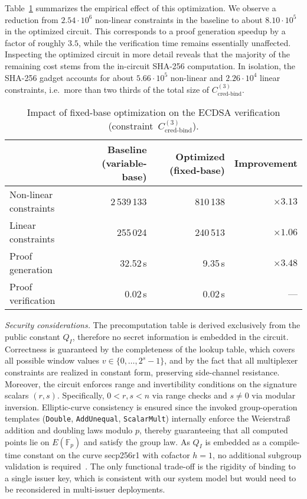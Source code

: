 \medskip
Table~\ref{tab:fixed-base-comparison} summarizes the empirical effect of this optimization. We observe a reduction from $2.54 \cdot 10^6$ non-linear constraints in the baseline to about $8.10 \cdot 10^5$ in the optimized circuit. This corresponds to a proof generation speedup by a factor of roughly $3.5$, while the verification time remains essentially unaffected. Inspecting the optimized circuit in more detail reveals that the majority of the remaining cost stems from the in-circuit SHA-256 computation. In isolation, the SHA-256 gadget accounts for about $5.66 \cdot 10^5$ non-linear and $2.26 \cdot 10^4$ linear constraints, i.e.\ more than two thirds of the total size of $C_{\text{cred-bind}}^{(3)}$.

\begin{table}[t]
	\centering
	\begin{tabular}{lrrr}
		\toprule
		& \textbf{Baseline (variable-base)} & \textbf{Optimized (fixed-base)} & \textbf{Improvement} \\
		\midrule
		Non-linear constraints & 2\,539\,133 & 810\,138 & $\times 3.13$ \\
		Linear constraints     & 255\,024   & 240\,513 & $\times 1.06$ \\
		\midrule
		Proof generation       & 32.52\,s  & 9.35\,s & $\times 3.48$ \\
		Proof verification     & 0.02\,s   & 0.02\,s & --- \\
		\bottomrule
	\end{tabular}
	\caption{Impact of fixed-base optimization on the ECDSA verification (constraint~$C_{\text{cred-bind}}^{(3)}$).}
	\label{tab:fixed-base-comparison}
\end{table}

\medskip
\noindent\emph{Security considerations.} 
The precomputation table is derived exclusively from the public constant $Q_I$, therefore no secret information is embedded in the circuit. Correctness is guaranteed by the completeness of the lookup table, which covers all possible window values $v \in \{0,\dots,2^s-1\}$, and by the fact that all multiplexer constraints are realized in constant form, preserving side-channel resistance. Moreover, the circuit enforces range and invertibility conditions on the signature scalars $(r,s)$. Specifically, $0 < r,s < n$ via range checks and $s \neq 0$ via modular inversion. Elliptic-curve consistency is ensured since the invoked group-operation templates (\texttt{Double}, \texttt{AddUnequal}, \texttt{ScalarMult}) internally enforce the Weierstraß addition and doubling laws modulo $p$, thereby guaranteeing that all computed points lie on $E(\mathbb{F}_p)$ and satisfy the group law. As $Q_I$ is embedded as a compile-time constant on the curve secp256r1 with cofactor $h=1$, no additional subgroup validation is required~\cite{SEC2}. The only functional trade-off is the rigidity of binding to a single issuer key, which is consistent with our system model but would need to be reconsidered in multi-issuer deployments.


